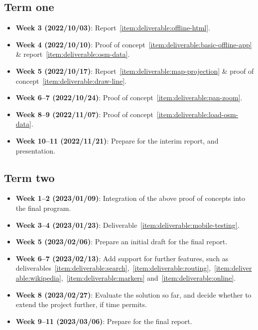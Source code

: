 \documentclass{final_report}
\begin{document}
\subsection{Term one}\label{sec:term-1-plan}

\begin{itemize}
    \item \textbf{Week 3 (2022/10/03)}: Report~\ref{item:deliverable:offline-html}.
    \item \textbf{Week 4 (2022/10/10)}: Proof of concept~\ref{item:deliverable:basic-offline-app} \& report~\ref{item:deliverable:osm-data}.
    \item \textbf{Week 5 (2022/10/17)}: Report~\ref{item:deliverable:map-projection} \& proof of concept~\ref{item:deliverable:draw-line}.
    \item \textbf{Week 6--7 (2022/10/24)}: Proof of concept~\ref{item:deliverable:pan-zoom}.
    \item \textbf{Week 8--9 (2022/11/07)}: Proof of concept~\ref{item:deliverable:load-osm-data}.
    \item \textbf{Week 10--11 (2022/11/21)}: Prepare for the interim report, and presentation.
\end{itemize}

\subsection{Term two}

\begin{itemize}
    \item \textbf{Week 1--2 (2023/01/09)}: Integration of the above proof of concepts into the final program.
    \item \textbf{Week 3--4 (2023/01/23)}: Deliverable~\ref{item:deliverable:mobile-testing}.
    \item \textbf{Week 5 (2023/02/06)}: Prepare an initial draft for the final report.
    \item \textbf{Week 6--7 (2023/02/13)}: Add support for further features, such as deliverables~\ref{item:deliverable:search},~\ref{item:deliverable:routing},~\ref{item:deliverable:wikipedia},~\ref{item:deliverable:markers} and~\ref{item:deliverable:online}.
    \item \textbf{Week 8 (2023/02/27)}: Evaluate the solution so far, and decide whether to extend the project further, if time permits.
    \item \textbf{Week 9--11 (2023/03/06)}: Prepare for the final report.
\end{itemize}
\end{document}
